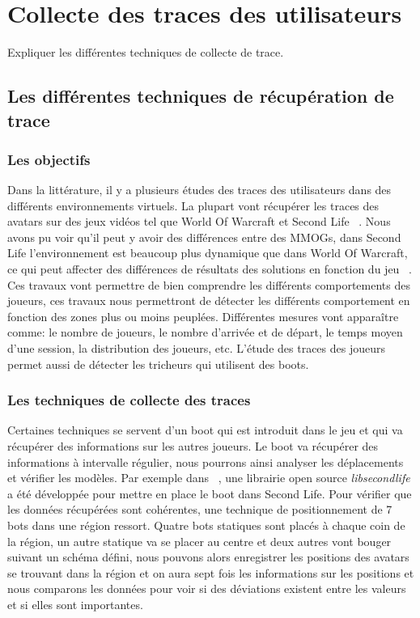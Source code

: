 \newpage
\section{Collecte des traces des utilisateurs}
	\label{trace}
	Expliquer les différentes techniques de collecte de trace.
	\subsection{Les différentes techniques de récupération de trace}
		\subsubsection{Les objectifs}
		Dans la littérature, il y a plusieurs études des traces des utilisateurs dans des différents environnements virtuels. La plupart vont récupérer les traces des avatars sur des jeux vidéos tel que World Of Warcraft et Second Life ~\cite{1326262,0295-5075-88-4-48007}. Nous avons pu voir qu'il peut y avoir des différences entre des MMOGs, dans Second Life l'environnement est beaucoup plus dynamique que dans World Of Warcraft, ce qui peut affecter des différences de résultats des solutions en fonction du jeu ~\cite{DBLP:journals/corr/abs-0807-2328,1613041}. Ces travaux vont permettre de bien comprendre les différents comportements des joueurs, ces travaux nous permettront de détecter les différents comportement en fonction des zones plus ou moins peuplées. Différentes mesures vont apparaître comme: le nombre de joueurs, le nombre d'arrivée et de départ, le temps moyen d'une session, la distribution des joueurs, etc. L'étude des traces des joueurs permet aussi de détecter les tricheurs qui utilisent des boots. \\
		\subsubsection{Les techniques de collecte des traces}
	Certaines techniques se servent d'un boot qui est introduit dans le jeu et qui va récupérer des informations sur les autres joueurs. Le boot va récupérer des informations à intervalle régulier, nous pourrons ainsi analyser les déplacements et vérifier les modèles. Par exemple dans ~\cite{DBLP:journals/corr/abs-0807-2328}, une librairie open source \textit{libsecondlife} a été développée pour mettre en place le boot dans Second Life. Pour vérifier que les données récupérées sont cohérentes, une technique de positionnement de 7 bots dans une région ressort. Quatre bots statiques sont placés à chaque coin de la région, un autre statique va se placer au centre et deux autres vont bouger suivant un schéma défini, nous pouvons alors enregistrer les positions des avatars se trouvant dans la région et on aura sept fois les informations sur les positions et nous comparons les données pour voir si des déviations existent entre les valeurs et si elles sont importantes.\\  
